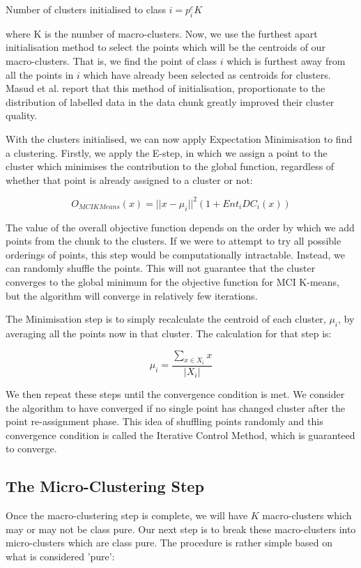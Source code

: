 \documentclass[12pt,a4paper,oneside]{report}
\begin{document}
Number of clusters initialised to class \(i  = p_i^cK\) 

where K is the number of macro-clusters. Now, we use the furthest apart initialisation method to select the points which will be the centroids of our macro-clusters. That is, we find the point of class \(i\) which is furthest away from all the points in \(i\) which have already been selected as centroids for clusters. Masud et al. report that this method of initialisation, proportionate to the distribution of labelled data in the data chunk greatly improved their cluster quality.\cite{TechRep}

With the clusters initialised, we can now apply Expectation Minimisation to find a clustering. Firstly, we apply the E-step, in which we assign a point to the cluster which minimises the contribution to the global function, regardless of whether that point is already assigned to a cluster or not: 

 \[O_{MCIKMeans}(x) = || x - \mu_i||^2(1 + Ent_iDC_i(x)) \]
 
The value of the overall objective function depends on the order by which we add points from the chunk to the clusters. If we were to attempt to try all possible orderings of points, this step would be computationally intractable. Instead, we can randomly shuffle the points. This will not guarantee that the cluster converges to the global minimum for the objective function for MCI K-means, but the algorithm will converge in relatively few iterations. 

The Minimisation step is to simply recalculate the centroid of each cluster, \(\mu_i\), by averaging all the points now in that cluster. The calculation for that step is: 

\[\mu_i = \frac{\sum_{x \in X_i}x}{|X_i|}\]

We then repeat these steps until the convergence condition is met. We consider the algorithm to have converged if no single point has changed cluster after the point re-assignment phase. This idea of shuffling points randomly and this convergence condition is called the Iterative Control Method, which is guaranteed to converge.\cite{ICM}  
 
 \subsection{The Micro-Clustering Step}
 
Once the macro-clustering step is complete, we will have \(K\) macro-clusters which may or may not be class pure. Our next step is to break these macro-clusters into micro-clusters which are class pure. The procedure is rather simple based on what is considered 'pure':
\end{document}
